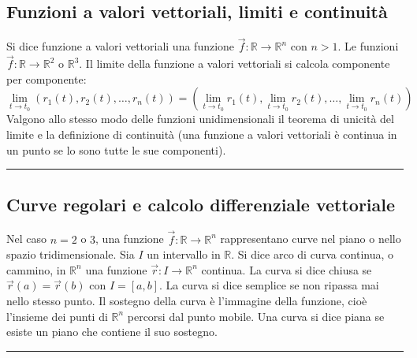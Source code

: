 \subsection*{Funzioni a valori vettoriali, limiti e continuità}
Si dice funzione a valori vettoriali una funzione $\vec{f} : \mathbb{R} \rightarrow  \mathbb{R}^n$ con $n > 1$. Le funzioni $\vec{f} : \mathbb{R} \rightarrow \mathbb{R}^2$ o $\mathbb{R}^3$.\newline
Il limite della funzione a valori vettoriali si calcola componente per componente:
\[
    \lim_{t\rightarrow t_0}(r_1(t), r_2(t), \dots, r_n(t)) = \left(\lim_{t\rightarrow t_0}r_1(t), \lim_{t\rightarrow t_0}r_2(t), \dots, \lim_{t\rightarrow t_0}r_n(t)\right)
\]
Valgono allo stesso modo delle funzioni unidimensionali il teorema di unicità del limite e la definizione di continuità (una funzione a valori vettoriali è continua in un punto se lo sono tutte le sue componenti).\newline
\rule{\textwidth}{2pt}
\subsection*{Curve regolari e calcolo differenziale vettoriale}
Nel caso $n = 2$ o $3$, una funzione $\vec{f} : \mathbb{R} \rightarrow  \mathbb{R}^n$ rappresentano curve nel piano o nello spazio tridimensionale.\newline
Sia $I$ un intervallo in $\mathbb{R}$. Si dice arco di curva continua, o cammino, in $\mathbb{R}^n$ una funzione $\vec{r}: I \rightarrow \mathbb{R}^n$ continua.\newline
La curva si dice chiusa se $\vec{r}(a) = \vec{r}(b)$ con $I=[a,b]$.\newline
La curva si dice semplice se non ripassa mai nello stesso punto.\newline
Il sostegno della curva è l'immagine della funzione, cioè l'insieme dei punti di $\mathbb{R}^n$ percorsi dal punto mobile.\newline
Una curva si dice piana se esiste un piano che contiene il suo sostegno.\newline
\rule{\textwidth}{0,4pt}

